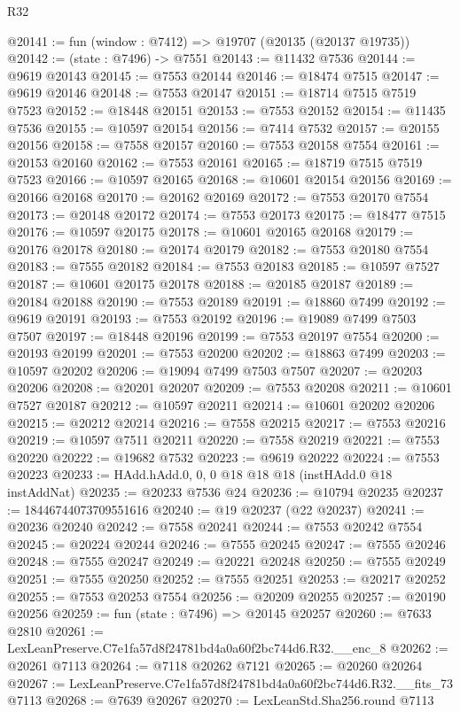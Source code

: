 \begin{lexlean}{R32}
\begin{coremodule}
@20141 := fun (window : @7412) => @19707 (@20135 (@20137 @19735))
@20142 := (state : @7496) -> @7551
@20143 := @11432 @7536
@20144 := @9619 @20143
@20145 := @7553 @20144
@20146 := @18474 @7515
@20147 := @9619 @20146
@20148 := @7553 @20147
@20151 := @18714 @7515 @7519 @7523
@20152 := @18448 @20151
@20153 := @7553 @20152
@20154 := @11435 @7536
@20155 := @10597 @20154
@20156 := @7414 @7532
@20157 := @20155 @20156
@20158 := @7558 @20157
@20160 := @7553 @20158 @7554
@20161 := @20153 @20160
@20162 := @7553 @20161
@20165 := @18719 @7515 @7519 @7523
@20166 := @10597 @20165
@20168 := @10601 @20154 @20156
@20169 := @20166 @20168
@20170 := @20162 @20169
@20172 := @7553 @20170 @7554
@20173 := @20148 @20172
@20174 := @7553 @20173
@20175 := @18477 @7515
@20176 := @10597 @20175
@20178 := @10601 @20165 @20168
@20179 := @20176 @20178
@20180 := @20174 @20179
@20182 := @7553 @20180 @7554
@20183 := @7555 @20182
@20184 := @7553 @20183
@20185 := @10597 @7527
@20187 := @10601 @20175 @20178
@20188 := @20185 @20187
@20189 := @20184 @20188
@20190 := @7553 @20189
@20191 := @18860 @7499
@20192 := @9619 @20191
@20193 := @7553 @20192
@20196 := @19089 @7499 @7503 @7507
@20197 := @18448 @20196
@20199 := @7553 @20197 @7554
@20200 := @20193 @20199
@20201 := @7553 @20200
@20202 := @18863 @7499
@20203 := @10597 @20202
@20206 := @19094 @7499 @7503 @7507
@20207 := @20203 @20206
@20208 := @20201 @20207
@20209 := @7553 @20208
@20211 := @10601 @7527 @20187
@20212 := @10597 @20211
@20214 := @10601 @20202 @20206
@20215 := @20212 @20214
@20216 := @7558 @20215
@20217 := @7553 @20216
@20219 := @10597 @7511 @20211
@20220 := @7558 @20219
@20221 := @7553 @20220
@20222 := @19682 @7532
@20223 := @9619 @20222
@20224 := @7553 @20223
@20233 := HAdd.hAdd.{0, 0, 0} @18 @18 @18 (instHAdd.{0} @18 instAddNat)
@20235 := @20233 @7536 @24
@20236 := @10794 @20235
@20237 := 18446744073709551616
@20240 := @19 @20237 (@22 @20237)
@20241 := @20236 @20240
@20242 := @7558 @20241
@20244 := @7553 @20242 @7554
@20245 := @20224 @20244
@20246 := @7555 @20245
@20247 := @7555 @20246
@20248 := @7555 @20247
@20249 := @20221 @20248
@20250 := @7555 @20249
@20251 := @7555 @20250
@20252 := @7555 @20251
@20253 := @20217 @20252
@20255 := @7553 @20253 @7554
@20256 := @20209 @20255
@20257 := @20190 @20256
@20259 := fun (state : @7496) => @20145 @20257
@20260 := @7633 @2810
@20261 := LexLeanPreserve.C7e1fa57d8f24781bd4a0a60f2bc744d6.R32.__enc_8
@20262 := @20261 @7113
@20264 := @7118 @20262 @7121
@20265 := @20260 @20264
@20267 := LexLeanPreserve.C7e1fa57d8f24781bd4a0a60f2bc744d6.R32.__fits_73 @7113
@20268 := @7639 @20267
@20270 := LexLeanStd.Sha256.round @7113

\end{coremodule}
\end{lexlean}
